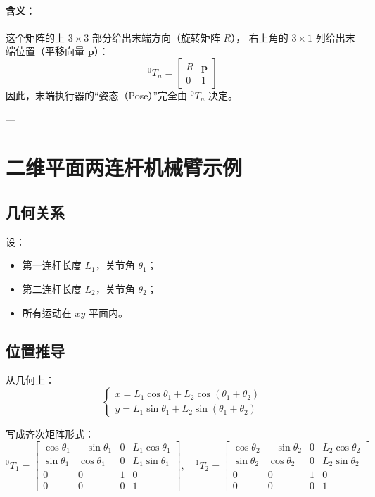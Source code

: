 \documentclass[12pt,a4paper]{article}
\begin{document}
\paragraph{含义：}
这个矩阵的上 $3\times3$ 部分给出末端方向（旋转矩阵 $R$），  
右上角的 $3\times1$ 列给出末端位置（平移向量 $\boldsymbol{p}$）：
\[
^{0}T_n =
\begin{bmatrix}
R & \boldsymbol{p}\\
0 & 1
\end{bmatrix}
\]
因此，末端执行器的“姿态（Pose）”完全由 $^{0}T_n$ 决定。

---

\section{二维平面两连杆机械臂示例}
\subsection{几何关系}
设：
\begin{itemize}
  \item 第一连杆长度 $L_1$，关节角 $\theta_1$；
  \item 第二连杆长度 $L_2$，关节角 $\theta_2$；
  \item 所有运动在 $xy$ 平面内。
\end{itemize}

\subsection{位置推导}
从几何上：
\[
\begin{cases}
x = L_1\cos\theta_1 + L_2\cos(\theta_1+\theta_2)\\[6pt]
y = L_1\sin\theta_1 + L_2\sin(\theta_1+\theta_2)
\end{cases}
\]

写成齐次矩阵形式：
\[
^{0}T_1 =
\begin{bmatrix}
\cos\theta_1 & -\sin\theta_1 & 0 & L_1\cos\theta_1\\
\sin\theta_1 & \cos\theta_1 & 0 & L_1\sin\theta_1\\
0 & 0 & 1 & 0\\
0 & 0 & 0 & 1
\end{bmatrix},
\quad
^{1}T_2 =
\begin{bmatrix}
\cos\theta_2 & -\sin\theta_2 & 0 & L_2\cos\theta_2\\
\sin\theta_2 & \cos\theta_2 & 0 & L_2\sin\theta_2\\
0 & 0 & 1 & 0\\
0 & 0 & 0 & 1
\end{bmatrix}
\]
\end{document}
